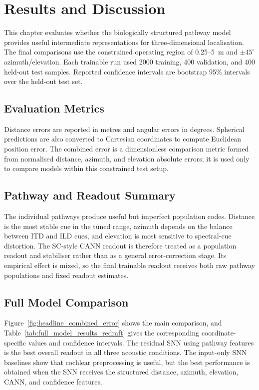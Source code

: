 \chapter{Results and Discussion} \label{ch:results}

This chapter evaluates whether the biologically structured pathway model provides useful intermediate representations for three-dimensional localisation. The final comparisons use the constrained operating region of 0.25--5~m and $\pm45^\circ$ azimuth/elevation. Each trainable run used 2000 training, 400 validation, and 400 held-out test samples. Reported confidence intervals are bootstrap 95\% intervals over the held-out test set.

\section{Evaluation Metrics}

Distance errors are reported in metres and angular errors in degrees. Spherical predictions are also converted to Cartesian coordinates to compute Euclidean position error. The combined error is a dimensionless comparison metric formed from normalised distance, azimuth, and elevation absolute errors; it is used only to compare models within this constrained test setup.

\section{Pathway and Readout Summary}

The individual pathways produce useful but imperfect population codes. Distance is the most stable cue in the tuned range, azimuth depends on the balance between ITD and ILD cues, and elevation is most sensitive to spectral-cue distortion. The SC-style CANN readout is therefore treated as a population readout and stabiliser rather than as a general error-correction stage. Its empirical effect is mixed, so the final trainable readout receives both raw pathway populations and fixed readout estimates.

\section{Full Model Comparison}

Figure~\ref{fig:headline_combined_error} shows the main comparison, and Table~\ref{tab:full_model_results_redraft} gives the corresponding coordinate-specific values and confidence intervals. The residual SNN using pathway features is the best overall readout in all three acoustic conditions. The input-only SNN baselines show that cochlear preprocessing is useful, but the best performance is obtained when the SNN receives the structured distance, azimuth, elevation, CANN, and confidence features.

